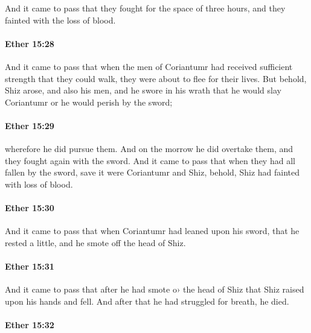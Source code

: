 			And it came to pass that they fought for the space of three hours,
			and they fainted with the loss of blood.

		\paragraph{Ether 15:28} %
			\label{ETHER-15-28}

			And it came to pass that
			when the men of Coriantumr had received sufficient strength
			that they could walk,
			they were about to flee for their lives.
			But behold, Shiz arose, and also his men,
			and he swore in his wrath that he would slay Coriantumr
			or he would perish by the sword;

		\paragraph{Ether 15:29} %
			\label{ETHER-15-29}

			wherefore he did pursue them.
			And on the morrow he did overtake them,
			and they fought again with the sword.
			And it came to pass that when they had all fallen by the sword,
			save it were Coriantumr and Shiz,
			behold, Shiz had fainted with loss of blood.

		\paragraph{Ether 15:30} %
			\label{ETHER-15-30}

			And it came to pass that when Coriantumr had leaned upon his sword,
			that he rested a little,
			and he smote off the head of Shiz.

		\paragraph{Ether 15:31} %
			\label{ETHER-15-31}

			And it came to pass that after he had smote o› the head of Shiz
			that Shiz raised upon his hands and fell.
			And after that he had struggled for breath, he died.

		\paragraph{Ether 15:32} %
			\label{ETHER-15-32}


